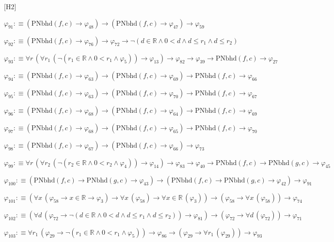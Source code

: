 \begin{fullproof}{[H2]}
\begin{abbrevlist}
\item $\varphi_{91} :\equiv (\mathrm{PNbhd}(f,c) \to \varphi_{48}) \to (\mathrm{PNbhd}(f,c) \to \varphi_{47}) \to \varphi_{59}$
\item $\varphi_{92} :\equiv (\mathrm{PNbhd}(f,c) \to \varphi_{76}) \to \varphi_{72} \to \neg (d \in \mathbb{R} \land 0 < d \land d \leq r_{1} \land d \leq r_{2})$
\item $\varphi_{93} :\equiv \forall r\,(\forall r_{1}\,(\neg (r_{1} \in \mathbb{R} \land 0 < r_{1} \land \varphi_{5})) \to \varphi_{13}) \to \varphi_{82} \to \varphi_{39} \to \mathrm{PNbhd}(f,c) \to \varphi_{27}$
\item $\varphi_{94} :\equiv (\mathrm{PNbhd}(f,c) \to \varphi_{63}) \to (\mathrm{PNbhd}(f,c) \to \varphi_{69}) \to \mathrm{PNbhd}(f,c) \to \varphi_{66}$
\item $\varphi_{95} :\equiv (\mathrm{PNbhd}(f,c) \to \varphi_{63}) \to (\mathrm{PNbhd}(f,c) \to \varphi_{70}) \to \mathrm{PNbhd}(f,c) \to \varphi_{67}$
\item $\varphi_{96} :\equiv (\mathrm{PNbhd}(f,c) \to \varphi_{68}) \to (\mathrm{PNbhd}(f,c) \to \varphi_{64}) \to \mathrm{PNbhd}(f,c) \to \varphi_{69}$
\item $\varphi_{97} :\equiv (\mathrm{PNbhd}(f,c) \to \varphi_{68}) \to (\mathrm{PNbhd}(f,c) \to \varphi_{65}) \to \mathrm{PNbhd}(f,c) \to \varphi_{70}$
\item $\varphi_{98} :\equiv (\mathrm{PNbhd}(f,c) \to \varphi_{67}) \to (\mathrm{PNbhd}(f,c) \to \varphi_{66}) \to \varphi_{73}$
\item $\varphi_{99} :\equiv \forall r\,(\forall r_{2}\,(\neg (r_{2} \in \mathbb{R} \land 0 < r_{2} \land \varphi_{4})) \to \varphi_{14}) \to \varphi_{83} \to \varphi_{40} \to \mathrm{PNbhd}(f,c) \to \mathrm{PNbhd}(g,c) \to \varphi_{45}$
\item $\varphi_{100} :\equiv (\mathrm{PNbhd}(f,c) \to \mathrm{PNbhd}(g,c) \to \varphi_{43}) \to (\mathrm{PNbhd}(f,c) \to \mathrm{PNbhd}(g,c) \to \varphi_{42}) \to \varphi_{91}$
\item $\varphi_{101} :\equiv (\forall x\,(\varphi_{58} \to x \in \mathbb{R} \to \varphi_{3}) \to \forall x\,(\varphi_{58}) \to \forall x \in \mathbb{R}\,(\varphi_{3})) \to (\varphi_{58} \to \forall x\,(\varphi_{58})) \to \varphi_{74}$
\item $\varphi_{102} :\equiv (\forall d\,(\varphi_{72} \to \neg (d \in \mathbb{R} \land 0 < d \land d \leq r_{1} \land d \leq r_{2})) \to \varphi_{81}) \to (\varphi_{72} \to \forall d\,(\varphi_{72})) \to \varphi_{71}$
\item $\varphi_{103} :\equiv \forall r_{1}\,(\varphi_{29} \to \neg (r_{1} \in \mathbb{R} \land 0 < r_{1} \land \varphi_{5})) \to \varphi_{86} \to (\varphi_{29} \to \forall r_{1}\,(\varphi_{29})) \to \varphi_{93}$

\end{abbrevlist}
\end{fullproof}
